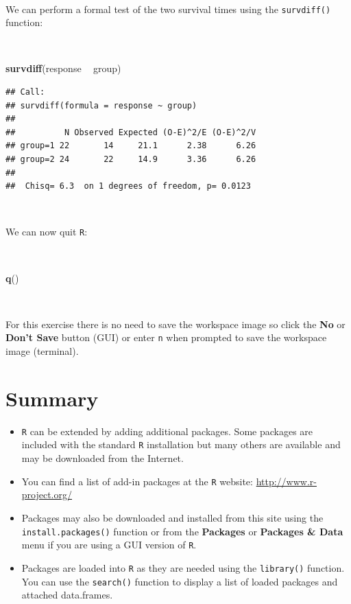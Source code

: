 \documentclass[12pt,a4paper]{book}
\newenvironment{Shaded}{\begin{snugshade}}{\end{snugshade}}
\newcommand{\KeywordTok}[1]{\textcolor[rgb]{0.13,0.29,0.53}{\textbf{#1}}}
\newcommand{\NormalTok}[1]{#1}
\newcommand{\OperatorTok}[1]{\textcolor[rgb]{0.81,0.36,0.00}{\textbf{#1}}}
\newcommand{\StringTok}[1]{\textcolor[rgb]{0.31,0.60,0.02}{#1}}
\theoremstyle{definition}
\theoremstyle{definition}
\theoremstyle{definition}
\theoremstyle{remark}
\begin{document}
~

We can perform a formal test of the two survival times using the
\texttt{survdiff()} function:

~

\begin{Shaded}
\begin{Highlighting}[]
\KeywordTok{survdiff}\NormalTok{(response }\OperatorTok{~}\StringTok{ }\NormalTok{group)}
\end{Highlighting}
\end{Shaded}

\begin{verbatim}
## Call:
## survdiff(formula = response ~ group)
## 
##          N Observed Expected (O-E)^2/E (O-E)^2/V
## group=1 22       14     21.1      2.38      6.26
## group=2 24       22     14.9      3.36      6.26
## 
##  Chisq= 6.3  on 1 degrees of freedom, p= 0.0123
\end{verbatim}

~

We can now quit \texttt{R}:

~

\begin{Shaded}
\begin{Highlighting}[]
\KeywordTok{q}\NormalTok{()}
\end{Highlighting}
\end{Shaded}

~

For this exercise there is no need to save the workspace image so click
the \textbf{No} or \textbf{Don't Save} button (GUI) or enter \texttt{n}
when prompted to save the workspace image (terminal).

\hypertarget{summary-4}{%
\section{Summary}\label{summary-4}}

\begin{itemize}
\item
  \texttt{R} can be extended by adding additional packages. Some
  packages are included with the standard \texttt{R} installation but
  many others are available and may be downloaded from the Internet.
\item
  You can find a list of add-in packages at the \texttt{R} website:
  \url{http://www.r-project.org/}
\item
  Packages may also be downloaded and installed from this site using the
  \texttt{install.packages()} function or from the \textbf{Packages} or
  \textbf{Packages \& Data} menu if you are using a GUI version of
  \texttt{R}.
\item
  Packages are loaded into \texttt{R} as they are needed using the
  \texttt{library()} function. You can use the \texttt{search()}
  function to display a list of loaded packages and attached
  data.frames.
\end{itemize}
\end{document}
